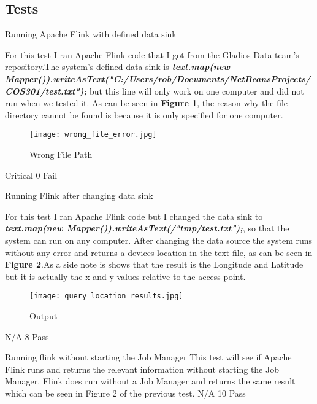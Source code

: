 \subsection{Tests}
\FuncReq
{Running Apache Flink with defined data sink}
{For this test I ran Apache Flink code that I got from the Gladios Data team's repository.The system's defined data sink is \textbf{\textit{  text.map(new Mapper()).writeAsText("C:/Users/rob/Documents/NetBeansProjects/COS301/test.txt");}} but this line will only work on one computer and did not run when we tested it. As can be seen in \textbf{Figure 1}, the reason why the file directory cannot be found is because it is only specified for one computer.
			\begin{figure}[h]
				\centering
				\texttt{[image: wrong\_file\_error.jpg]}
				\caption{Wrong File Path}
				\label{fig:WrongFIlePath}
			\end{figure} }
{Critical}
{0}
{Fail}
		

{Running Flink after changing data sink}
{For this test I ran Apache Flink code but I changed the data sink to \textbf{\textit{  text.map(new Mapper()).writeAsText(/"tmp/test.txt");}}, so that the system can run on any computer. After changing the data source the system runs without any error and returns a devices location in the text file, as can be seen in \textbf{Figure 2}.As a side note is shows that the result is the Longitude and Latitude but it is actually the x and y values relative to the access point.
		\begin{figure}[h]
			\centering
			\texttt{[image: query\_location\_results.jpg]}
			\caption{Output}
			\label{fig:Output}
		\end{figure} 
}
		
{N/A}
{8}
{Pass}
		
{Running flink without starting the Job Manager}
{This test will see if Apache Flink runs and returns the relevant information without starting the Job Manager. Flink does run without a Job Manager and returns the same result which can be seen in Figure 2 of the previous test.}
{N/A}
{10}
{Pass}

